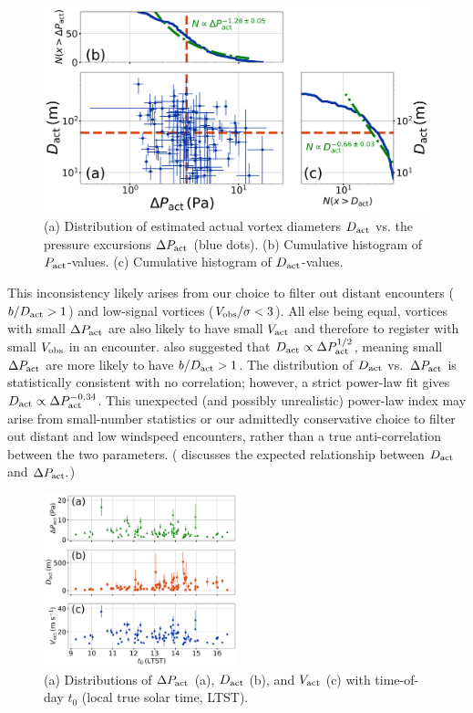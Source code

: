 \documentclass{aastex63}
\begin{document}
\begin{figure}
    \centering
    \includegraphics[width=\textwidth]{figures/Dact_vs_Pact.png}
    \caption{(a) Distribution of estimated actual vortex diameters $D_{\rm act}$ vs. the pressure excursions $\Delta P_{\rm act}$ (blue dots). (b) Cumulative histogram of $P_{\rm act}$-values. (c) Cumulative histogram of $D_{\rm act}$-values.}
    \label{fig:Dact_vs_Pact}
\end{figure}

This inconsistency likely arises from our choice to filter out distant encounters ($b/D_{\rm act} > 1$) and low-signal vortices ($V_{\rm obs}/\sigma < 3$). All else being equal, vortices with small $\Delta P_{\rm act}$ are also likely to have small $V_{\rm act}$ and therefore to register with small $V_{\rm obs}$ in an encounter. \citet{2020Icar..33813523J} also suggested that $D_{\rm act} \propto \Delta P_{\rm act}^{1/2}$, meaning small $\Delta P_{\rm act}$ are more likely to have $b/D_{\rm act} > 1$. The distribution of $D_{\rm act}$ vs.~$\Delta P_{\rm act}$ is statistically consistent with no correlation; however, a strict power-law fit gives $D_{\rm act} \propto \Delta P_{\rm act}^{-0.34}$. This unexpected (and possibly unrealistic) power-law index may arise from small-number statistics or our admittedly conservative choice to filter out distant and low windspeed encounters, rather than a true anti-correlation between the two parameters. (\citet{2019Icar..317..209K} discusses the expected relationship between $D_{\rm act}$ and $\Delta P_{\rm act}.$)

\begin{figure}
    \centering
    \includegraphics[width=0.5\textwidth]{figures/all_actual_values_vs_t0.png}
    \caption{(a) Distributions of $\Delta P_{\rm act}$ (a), $D_{\rm act}$ (b), and $V_{\rm act}$ (c) with time-of-day $t_0$ (local true solar time, LTST).}
    \label{fig:all_actual_values_vs_t0}
\end{figure}
\end{document}
